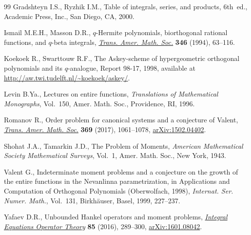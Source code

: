 \documentclass[pdftex]{sigma}
\numberwithin{equation}{section}
\begin{document}
\begin{thebibliography}{99}
Gradshteyn I.S., Ryzhik I.M., Table of integrals, series, and products, 6th~ed., Academic Press, Inc., San Diego, CA, 2000.

Ismail M.E.H., Masson D.R., {$q$}-{H}ermite polynomials, biorthogonal rational
 functions, and {$q$}-beta integrals, \href{https://doi.org/10.2307/2154943}{\textit{Trans. Amer. Math. Soc.}}
 \textbf{346} (1994), 63--116.

Koekoek R., Swarttouw R.F., The Askey-scheme of hypergeometric orthogonal
 polynomials and its $q$-analogue, Report 98-17, 1998, available at
 \url{http://aw.twi.tudelft.nl/~koekoek/askey/}.

Levin B.Ya., Lectures on entire functions, \textit{Translations of Mathematical
 Monographs}, Vol.~150, Amer. Math. Soc., Providence, RI, 1996.

Romanov R., Order problem for canonical systems and a conjecture of {V}alent,
 \href{https://doi.org/10.1090/tran6686}{\textit{Trans. Amer. Math. Soc.}} \textbf{369} (2017), 1061--1078,
 \href{https://arxiv.org/abs/1502.04402}{arXiv:1502.04402}.

Shohat J.A., Tamarkin J.D., The {P}roblem of {M}oments, \textit{American
 Mathematical Society Mathematical Surveys}, Vol.~1, Amer. Math. Soc., New
 York, 1943.

Valent G., Indeterminate moment problems and a conjecture on the growth of the
 entire functions in the {N}evanlinna parametrization, in Applications and
 Computation of Orthogonal Polynomials ({O}berwolfach, 1998),
 \textit{Internat. Ser. Numer. Math.}, Vol.~131, Birkh\"{a}user, Basel, 1999,
 227--237.

Yafaev D.R., Unbounded {H}ankel operators and moment problems, \href{https://doi.org/10.1007/s00020-016-2289-y}{\textit{Integral
 Equations Operator Theory}} \textbf{85} (2016), 289--300, \href{https://arxiv.org/abs/1601.08042}{arXiv:1601.08042}.

\end{thebibliography}\LastPageEnding
\end{document}
